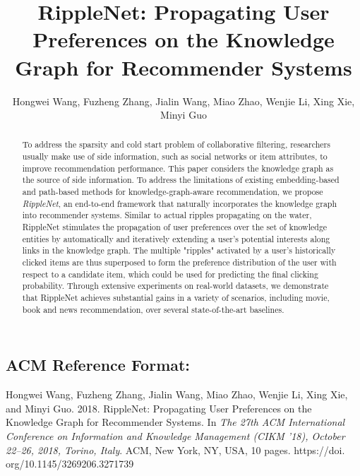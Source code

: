 \documentclass[sigconf]{acmart}
\begin{document}
\title[RippleNet for Recommender Systems]{RippleNet: Propagating User Preferences on the Knowledge Graph for Recommender Systems}


\author[H. Wang et al.]{Hongwei Wang, Fuzheng Zhang, Jialin Wang, Miao Zhao, Wenjie Li, Xing Xie, Minyi Guo}



\begin{abstract}
	To address the sparsity and cold start problem of collaborative filtering, researchers usually make use of side information, such as social networks or item attributes, to improve recommendation performance.
	This paper considers the knowledge graph as the source of side information.
 	To address the limitations of existing embedding-based and path-based methods for knowledge-graph-aware recommendation, we propose \textit{RippleNet}, an end-to-end framework that naturally incorporates the knowledge graph into recommender systems.
 	Similar to actual ripples propagating on the water, RippleNet stimulates the propagation of user preferences over the set of knowledge entities by automatically and iteratively extending a user's potential interests along links in the knowledge graph.
 	The multiple "ripples" activated by a user's historically clicked items are thus superposed to form the preference distribution of the user with respect to a candidate item, which could be used for predicting the final clicking probability.
 	Through extensive experiments on real-world datasets, we demonstrate that RippleNet achieves substantial gains in a variety of scenarios, including movie, book and news recommendation, over several state-of-the-art baselines.
\end{abstract}


\maketitle


\subsection*{\small{ACM Reference Format:}}
\vspace{-0.05in}
	{\small
		Hongwei Wang, Fuzheng Zhang, Jialin Wang, Miao Zhao, Wenjie Li, Xing Xie, and Minyi Guo.
		2018.
		RippleNet: Propagating User Preferences on the Knowledge Graph for Recommender Systems.
In \textit{The 27th ACM International Conference on Information and Knowledge Management (CIKM '18), October 22--26, 2018, Torino, Italy}.
		ACM, New York, NY, USA, 10 pages.
		https://doi.\\org/10.1145/3269206.3271739
	}
\end{document}
